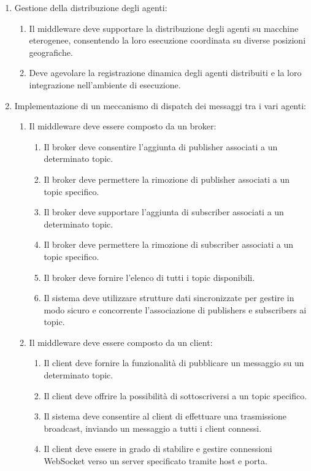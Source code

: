 \begin{enumerate}
      \item Gestione della distribuzione degli agenti:
            \begin{enumerate}
                  \item  Il middleware deve supportare la distribuzione degli agenti su macchine eterogenee,
                        consentendo la loro esecuzione coordinata su diverse posizioni geografiche.
                  \item Deve agevolare la registrazione dinamica degli agenti distribuiti e la
                        loro integrazione nell'ambiente di esecuzione.
            \end{enumerate}

      \item Implementazione di un meccanismo di dispatch dei messaggi tra i vari agenti:
            \begin{enumerate}
                  \item Il middleware deve essere composto da un broker:
                        \begin{enumerate}
                              \item Il broker deve consentire l'aggiunta di publisher associati a un determinato topic.
                              \item Il broker deve permettere la rimozione di publisher associati a un topic specifico.
                              \item Il broker deve supportare l'aggiunta di subscriber associati a un determinato topic.
                              \item Il broker deve permettere la rimozione di subscriber associati a un topic specifico.
                              \item Il broker deve fornire l'elenco di tutti i topic disponibili.
                              \item Il sistema deve utilizzare strutture dati sincronizzate per gestire in modo sicuro e concorrente l'associazione di publishers e subscribers ai topic.
                        \end{enumerate}
                  \item Il middleware deve essere composto da un client:
                        \begin{enumerate}
                              \item Il client deve fornire la funzionalità di pubblicare un messaggio su un determinato topic.
                              \item Il client deve offrire la possibilità di sottoscriversi a un topic specifico.
                              \item Il sistema deve consentire al client di effettuare una trasmissione broadcast, inviando un messaggio a tutti i client connessi.
                              \item  Il client deve essere in grado di stabilire e gestire connessioni WebSocket verso un server specificato tramite host e porta.
                        \end{enumerate}
            \end{enumerate}


\end{enumerate}
